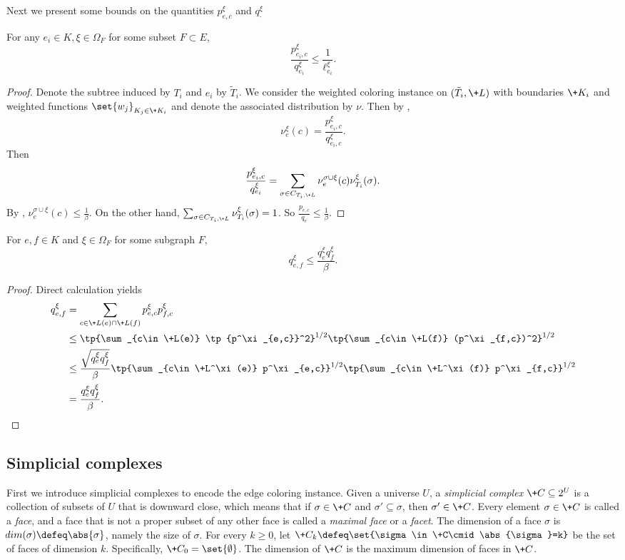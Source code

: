 \documentclass[a4paper,11pt]{article}
\begin{document}
Next we present some bounds on the quantities $p^\xi_{e, c}$ and $q^\xi_\cdot$
\begin{lemma}\label{lem:marginal-bound-weighted-1}
For any $e_i\in K, \xi\in \Omega_F$ for some subset $F \subset E$,
\[
\frac{p^\xi_{e_i,c}}{q^\xi_{e_i}}\le \frac{1}{\ell^\xi_{e_i}} .
\]
\end{lemma}
\begin{proof}
    Denote the subtree induced by $T_i$ and $e_i$ by $\tilde T_i$.
    We consider the weighted coloring instance on $(\tilde T_i, \+L)$ with boundaries
    $\+K_i$ and weighted functions $\set{w_j}_{K_j\in \+K_i}$
    and denote the associated distribution by $\nu$.
    Then by ,
    \[
    \nu^\xi_{e}(c) = \frac{p^\xi_{e_i, c}}{q^\xi_{e_i, c}}.
    \]
    Then
    \[
    \frac{p^\xi_{e_i,c}}{q^\xi_{e_i}}
    =
    \sum_{\sigma\in C_{T_i, \+L}} \nu^{\sigma\cup\xi}_e(c)\nu^\xi_{T_i}(\sigma).
    \]
By ,
$\nu^{\sigma\cup\xi}_e(c)\leq \frac{1}{\beta}$.
On the other hand, $\sum_{\sigma\in C_{T_i, \+L}} \nu^\xi_{T_i}(\sigma)=1$.
So $\frac{p_{e,c}}{q_e}\leq \frac{1}{\beta}$.
\end{proof}
\begin{lemma}\label{lem:marginal-bound-weighted-2}
For $e,f\in K$ and $\xi\in \Omega_F$ for some subgraph $F$,
    \[
    q^\xi_{e,f}\leq \frac{q^\xi_e q^\xi_f}{\beta} .
    \]
\end{lemma}
\begin{proof}
    Direct calculation yields
\begin{align*}
q^\xi_{e,f}&=\sum_{c\in \+L(e)\cap \+L(f)} p^\xi_{e,c}p^\xi_{f,c}\\
&\leq \tp{\sum_{c\in \+L(e)} \tp{p^\xi_{e,c}}^2}^{1/2} \tp{\sum_{c\in \+L(f)} (p^\xi_{f,c})^2}^{1/2}\\
&\leq \frac{\sqrt{q^\xi_e q^\xi_f}}{\beta}\tp{\sum_{c\in \+L^\xi(e)} p^\xi_{e,c}}^{1/2} \tp{\sum_{c\in \+L^\xi(f)} p^\xi_{f,c}}^{1/2}\\
&=\frac{q^\xi_e q^\xi_f}{\beta}.
\end{align*}
\end{proof}

\subsection{Simplicial complexes}
First we introduce simplicial complexes to encode the edge coloring instance. Given a universe $U$, a \emph{simplicial complex} $\+C\subseteq 2^U$ is a collection of subsets of $U$ that is downward close, which means that if $\sigma\in \+C$ and $\sigma'\subseteq\sigma$, then $\sigma'\in \+C$. Every element $\sigma\in \+C$ is called a \emph{face}, and a face that is not a proper subset of any other face is called a \emph{maximal face} or a \emph{facet}. The dimension of a face $\sigma$ is $\!{dim}(\sigma)\defeq \abs{\sigma}$, namely the size of $\sigma$. For every $k\ge 0$, let $\+C_k\defeq \set{\sigma\in\+C\cmid \abs{\sigma}=k}$ be the set of faces of dimension $k$. Specifically, $\+C_0=\set{\emptyset}$. The dimension of $\+C$ is the maximum dimension of faces in $\+C$. 
\end{document}
